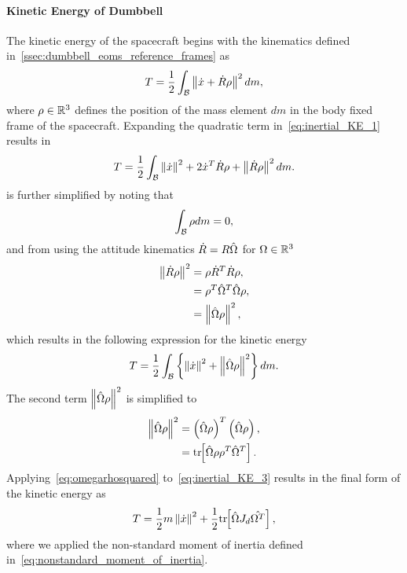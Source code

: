 \paragraph{Kinetic Energy of Dumbbell}\label{sec:inertial_kinetic_energy}
The kinetic energy of the spacecraft begins with the kinematics defined in~\cref{ssec:dumbbell_eoms_reference_frames} as
\begin{align}\label{eq:inertial_KE_1}
    T = \frac{1}{2} \int_{\mathcal{B}} \left\|  \dot{x} + \dot{R} \rho \right\|^2 dm,
\end{align}
where \( \rho \in \mathbb{R}^3 \) defines the position of the mass element \( dm \) in the body fixed frame of the spacecraft.
Expanding the quadratic term in~\cref{eq:inertial_KE_1} results in
\begin{align}\label{eq:inertial_KE_2}
T = \frac{1}{2} \int_{\mathcal{B}}  \left\| \dot{x} \right\|^2 + 2 \dot{x}^T \dot{R} \rho + \left\| \dot{R} \rho  \right\|^2    dm .
\end{align}
 is further simplified by noting that
\begin{align*}
    \int_{\mathcal{B}} \rho dm = 0,
\end{align*}
and from using the attitude kinematics \( \dot{R} = R \hat{\Omega} \) for \( \Omega \in \mathbb{R}^3 \) 
\begin{align*}
    \left\| \dot{R} \rho  \right\|^2 &= \rho\dot{R}^T \dot{R} \rho , \\
                                &=  \rho^T \hat{\Omega}^T \hat{\Omega} \rho , \\
                                &= \left\|  \hat{\Omega} \rho  \right\|^2, 
\end{align*}
which results in the following expression for the kinetic energy
\begin{align}\label{eq:inertial_KE_3}
    T = \frac{1}{2} \int_{\mathcal{B}} \left\{  \left\| \dot{x} \right\|^2 + \left\| \hat{\Omega} \rho \right\|^2  \right\} dm.
\end{align}
The second term \( \left\| \hat{\Omega}\rho \right\|^2 \) is simplified to
\begin{align}
    \left\|  \hat{\Omega}\rho  \right\|^2 &= \left(  \hat{\Omega}\rho \right)^T \left( \hat{\Omega}\rho \right) , \nonumber\\
                                    &= \mathrm{tr}\negthickspace\left[  \hat{\Omega} \rho \rho^T \hat{\Omega}^T  \right].\label{eq:omegarhosquared}
\end{align}
Applying~\cref{eq:omegarhosquared} to~\cref{eq:inertial_KE_3} results in the final form of the kinetic energy as
\begin{align}\label{eq:inertial_kinetic_energy}
    T = \frac{1}{2} m \left\| \dot{x} \right\|^2 + \frac{1}{2} \mathrm{tr}\negthickspace\left[  \hat{\Omega}J_d \hat{\Omega^T }  \right], 
\end{align}
where we applied the non-standard moment of inertia defined in~\cref{eq:nonstandard_moment_of_inertia}.

